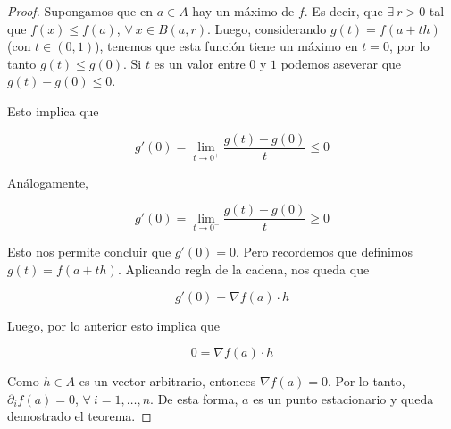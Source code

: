 \begin{proof}
    Supongamos que en $a \in A$ hay un máximo de $f$. Es decir, que $\exists~r > 0$ tal que $f(x) \leq f(a)$, $\forall~x \in B(a, r)$. Luego, considerando $g(t) = f(a + th)$ (con $t \in (0,1)$), tenemos que esta función tiene un máximo en $t = 0$, por lo tanto $g(t) \leq g(0)$. Si $t$ es un valor entre $0$ y $1$ podemos aseverar que $g(t) - g(0) \leq 0$.
    
    Esto implica que
    
    \[
    g'(0) = \lim_{t \to 0^{+}} \dfrac{g(t) - g(0)}{t} \leq 0
    \]
    
    Análogamente,
    
    \[
    g'(0) = \lim_{t \to 0^{-}} \dfrac{g(t) - g(0)}{t} \geq 0
    \]
    
    Esto nos permite concluir que $g'(0) = 0$. Pero recordemos que definimos $g(t) = f(a + th)$. Aplicando regla de la cadena, nos queda que
    
    \[
    g'(0) = \nabla f(a) \cdot h
    \]
    
    Luego, por lo anterior esto implica que
    
    \[
    0 = \nabla f(a) \cdot h
    \]
    
    Como $h \in A$ es un vector arbitrario, entonces $\nabla f(a) = 0$. Por lo tanto, $\partial_i f(a) = 0$, $\forall~i = 1, \dots, n$. De esta forma, $a$ es un punto estacionario y queda demostrado el teorema.
\end{proof}